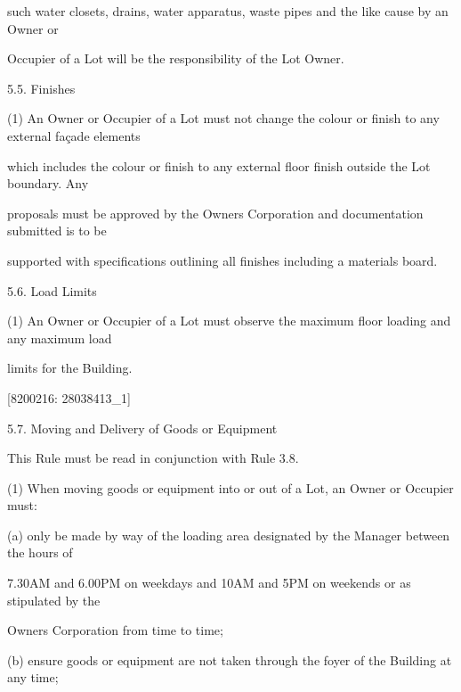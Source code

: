 \documentclass{article}
\begin{document}
{\fontsize{10.02}{1}such water closets, drains, water apparatus, waste pipes and the like cause by an Owner or }

{\fontsize{10.02}{1}Occupier of a Lot will be the responsibility of the Lot Owner. }

{\fontsize{9.99}{1}5.5. Finishes }

{\fontsize{9.962}{1}(1) An Owner or Occupier of a Lot must not change the colour or finish to any external façade elements }

{\fontsize{10.02}{1}which includes the colour or finish to any external floor finish outside the Lot boundary. Any }

{\fontsize{10.02}{1}proposals must be approved by the Owners Corporation and documentation submitted is to be }

{\fontsize{10.02}{1}supported with specifications outlining all finishes including a materials board. }

{\fontsize{9.99}{1}5.6. Load Limits }

{\fontsize{9.962}{1}(1) An Owner or Occupier of a Lot must observe the maximum floor loading and any maximum load }

{\fontsize{10.02}{1}limits for the Building. }

\newpage
















{\fontsize{7.02}{1}[8200216: 28038413\_1] }

{\fontsize{9.99}{1}5.7. Moving and Delivery of Goods or Equipment }

{\fontsize{10.02}{1}This Rule must be read in conjunction with Rule 3.8. }

{\fontsize{9.962}{1}(1) When moving goods or equipment into or out of a Lot, an Owner or Occupier must: }

{\fontsize{9.962}{1}(a) only be made by way of the loading area designated by the Manager between the hours of }

{\fontsize{10.02}{1}7.30AM and 6.00PM on weekdays and 10AM and 5PM on weekends or as stipulated by the }

{\fontsize{10.02}{1}Owners Corporation from time to time; }

{\fontsize{9.962}{1}(b) ensure goods or equipment are not taken through the foyer of the Building at any time; }
\end{document}
